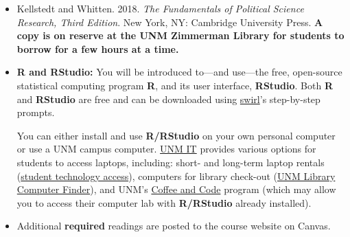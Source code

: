 \documentclass[11pt]{article}
\begin{document}
\begin{itemize}
\item Kellstedt and Whitten. 2018. \textit{The Fundamentals of Political Science Research, Third Edition}. New York, NY: Cambridge University Press. \textbf{A copy is on reserve at the UNM Zimmerman Library for students to borrow for a few hours at a time.}




\item \textbf{\textsf{R} and \textsf{RStudio}: }You will be introduced to---and use---the free, open-source statistical computing program \textbf{\textsf{R}}, and its user interface, \textbf{\textsf{RStudio}}. Both \textbf{\textsf{R}} and \textbf{\textsf{RStudio}} are free and can be downloaded using \href{https://swirlstats.com/students.htm}{swirl}'s step-by-step prompts.

You can either install and use \textbf{\textsf{R/RStudio}} on your own personal computer or use a UNM campus computer. \href{https://it.unm.edu/support/index.html}{UNM IT} provides various options for students to access laptops, including: short- and long-term laptop rentals (\href{https://at.unm.edu/coronavirus/student-tech-access.html}{student technology access}), computers for library check-out (\href{https://library.unm.edu/services/technology/computers/finder.php}{UNM Library Computer Finder}), and
UNM's \href{https://libguides.unm.edu/coffee-and-code/Coffee-and-Code}{Coffee and Code} program (which may allow you to access their computer lab with \textbf{\textsf{R/RStudio}} already installed). 
    
\item Additional \textbf{required} readings are posted to the course website on Canvas.
\end{itemize}
\end{document}
